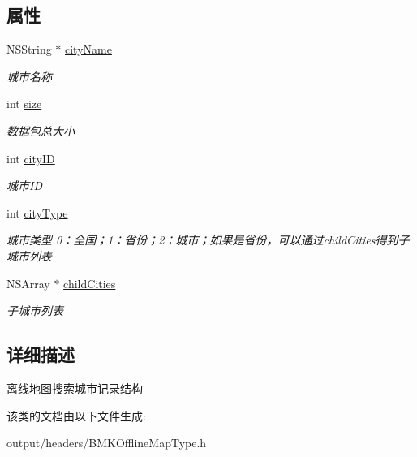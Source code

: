 \subsection*{属性}
\begin{DoxyCompactItemize}
\item 
\hypertarget{interface_b_m_k_o_l_search_record_a9b511c21c21f4b67eef345b11c0e9826}{}N\+S\+String $\ast$ \hyperlink{interface_b_m_k_o_l_search_record_a9b511c21c21f4b67eef345b11c0e9826}{city\+Name}\label{interface_b_m_k_o_l_search_record_a9b511c21c21f4b67eef345b11c0e9826}

\begin{DoxyCompactList}\small\item\em 城市名称 \end{DoxyCompactList}\item 
\hypertarget{interface_b_m_k_o_l_search_record_a65d925120ac45eec0047bad23225f67f}{}int \hyperlink{interface_b_m_k_o_l_search_record_a65d925120ac45eec0047bad23225f67f}{size}\label{interface_b_m_k_o_l_search_record_a65d925120ac45eec0047bad23225f67f}

\begin{DoxyCompactList}\small\item\em 数据包总大小 \end{DoxyCompactList}\item 
\hypertarget{interface_b_m_k_o_l_search_record_a45d36f0768cca26895c7078900ad8d7b}{}int \hyperlink{interface_b_m_k_o_l_search_record_a45d36f0768cca26895c7078900ad8d7b}{city\+I\+D}\label{interface_b_m_k_o_l_search_record_a45d36f0768cca26895c7078900ad8d7b}

\begin{DoxyCompactList}\small\item\em 城市\+I\+D \end{DoxyCompactList}\item 
\hypertarget{interface_b_m_k_o_l_search_record_a74c11b249d3d97503c4a4efa880cc99a}{}int \hyperlink{interface_b_m_k_o_l_search_record_a74c11b249d3d97503c4a4efa880cc99a}{city\+Type}\label{interface_b_m_k_o_l_search_record_a74c11b249d3d97503c4a4efa880cc99a}

\begin{DoxyCompactList}\small\item\em 城市类型 0：全国；1：省份；2：城市；如果是省份，可以通过child\+Cities得到子城市列表 \end{DoxyCompactList}\item 
\hypertarget{interface_b_m_k_o_l_search_record_a883fcb06413f7da8b4e8a50e038a3e78}{}N\+S\+Array $\ast$ \hyperlink{interface_b_m_k_o_l_search_record_a883fcb06413f7da8b4e8a50e038a3e78}{child\+Cities}\label{interface_b_m_k_o_l_search_record_a883fcb06413f7da8b4e8a50e038a3e78}

\begin{DoxyCompactList}\small\item\em 子城市列表 \end{DoxyCompactList}\end{DoxyCompactItemize}


\subsection{详细描述}
离线地图搜索城市记录结构 

该类的文档由以下文件生成\+:\begin{DoxyCompactItemize}
\item 
output/headers/B\+M\+K\+Offline\+Map\+Type.\+h\end{DoxyCompactItemize}
